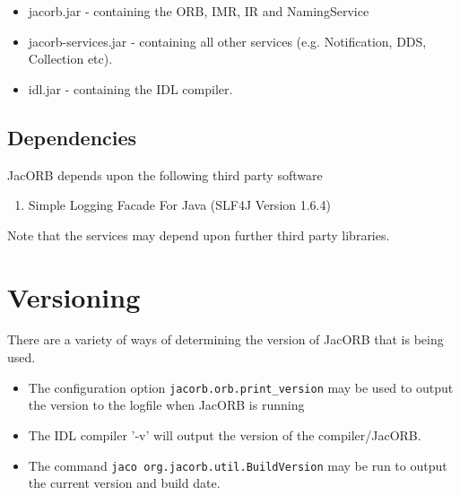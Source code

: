\begin{itemize}
\item jacorb.jar          - containing the ORB, IMR, IR and NamingService
\item jacorb-services.jar - containing all other services (e.g. Notification, DDS, Collection etc).
\item idl.jar             - containing the IDL compiler.
\end{itemize}

\subsection{Dependencies}

JacORB depends upon the following third party software
\begin{enumerate}
\item Simple Logging Facade For Java (SLF4J Version 1.6.4)
\end{enumerate}

Note that the services may depend upon further third party libraries.

\section{Versioning}
There are a variety of ways of determining the version of JacORB that is being used.
\begin{itemize}
\item The configuration option {\tt jacorb.orb.print\_version} may be used to output the version to the logfile when JacORB is running
\item The IDL compiler '-v' will output the version of the compiler/JacORB.
\item The command {\tt jaco org.jacorb.util.BuildVersion} may be run to output the current version and build date.
\end{itemize}

